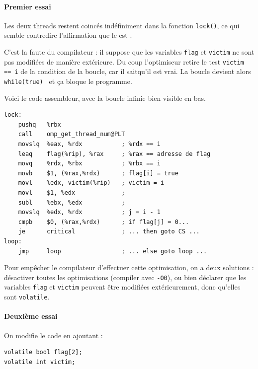 \paragraph{Premier essai} Les deux threads restent coincés indéfiniment dans la
fonction \texttt{lock()}, ce qui semble contredire l'affirmation que le
 est .

C'est la faute du compilateur : il suppose que les variables \texttt{flag} et
\texttt{victim} ne sont pas modifiées de manière extérieure. Du coup
l'optimiseur retire le test \texttt{victim == i} de la condition de la
boucle, car il \og sait\fg qu'il est vrai. La boucle devient alors
\texttt{while(true) {}} et ça bloque le programme.

\begin{danger}
  Voici le code assembleur, avec la boucle infinie bien visible en bas.
  \begin{myfilet}
\begin{verbatim}
lock:
	pushq   %rbx
	call    omp_get_thread_num@PLT
	movslq  %eax, %rdx           ; %rdx == i
	leaq    flag(%rip), %rax     ; %rax == adresse de flag
	movq    %rdx, %rbx           ; %rbx == i
	movb    $1, (%rax,%rdx)      ; flag[i] = true
	movl    %edx, victim(%rip)   ; victim = i
	movl    $1, %edx             ; 
	subl    %ebx, %edx           ; 
	movslq  %edx, %rdx           ; j = i - 1
	cmpb    $0, (%rax,%rdx)      ; if flag[j] = 0...
	je      critical             ; ... then goto CS ...
loop:
	jmp     loop                 ; ... else goto loop ...
\end{verbatim}
  \end{myfilet}
\end{danger}%

Pour empêcher le compilateur d'effectuer cette optimisation, on a deux solutions
: désactiver toutes les optimisations (compiler avec \texttt{-O0}), ou bien
déclarer que les variables \texttt{flag} et \texttt{victim} peuvent être
modifiées extérieurement, donc qu'elles sont \texttt{volatile}.

\paragraph{Deuxième essai} On modifie le code en ajoutant :
\begin{myfilet}
\begin{verbatim}
volatile bool flag[2];
volatile int victim;
\end{verbatim}
\end{myfilet}

